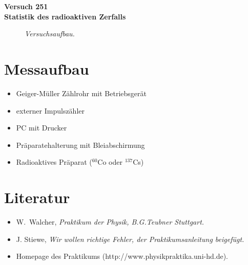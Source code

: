 \documentclass[landscape,twocolumn]{article}
\begin{document}
\setlength{\extrarowheight}{4pt} \pagestyle{fancyplain}

\cfoot{\large\vspace{0.1in}$\qquad$\rm\thepage}
 \setlength{\footrulewidth}{0.4pt}
\renewcommand{\thesection}{\Roman{section}}


\begin{center}
\LARGE\bf{Versuch 251\\ Statistik des radioaktiven Zerfalls}
\end{center}

\begin{figure}[h]
\begin{minipage}[c]{12cm}
\centering{}
\caption{\fontsize{10}{12}\it Versuchsaufbau.}
\end{minipage}
\end{figure}


\section{Messaufbau}
\begin{itemize}
 \item  Geiger-M\"{u}ller Z\"{a}hlrohr mit Betriebsger\"{a}t
 \item  externer Impulsz\"{a}hler
 \item PC mit Drucker
 \item Pr\"{a}paratehalterung mit Bleiabschirmung
 \item Radioaktives Pr\"{a}parat ($^{60}$Co oder $^{137}$Cs)
\end{itemize}

\section{Literatur}

\begin{itemize}
 \item W.~Walcher,  \it{Praktikum der Physik}\rm, B.G.Teubner
 Stuttgart.
\item J. Stiewe, \it Wir wollen richtige Fehler\rm, der
Praktikumsanleitung beigef\"{u}gt.
 \item  Homepage des Praktikums
(http://www.physikpraktika.uni-hd.de).
\end{itemize}
\end{document}
